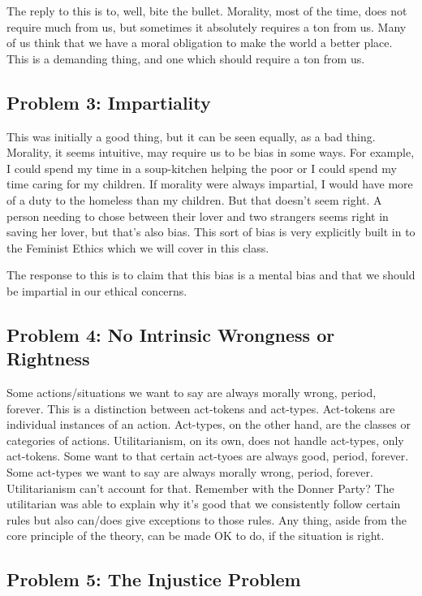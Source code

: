 The reply to this is to, well, bite the bullet. Morality, most of the time, does not require much from us, but sometimes it absolutely requires a ton from us. Many of us think that we have a moral obligation to make the world a better place. This is a demanding thing, and one which should require a ton from us.
\subsection{Problem 3: Impartiality}

This was initially a good thing, but it can be seen equally, as a bad thing. Morality, it seems intuitive, may require us to be bias in some ways. For example, I could spend my time in a soup-kitchen helping the poor or I could spend my time caring for my children. If morality were always impartial, I would have more of a duty to the homeless than my children. But that doesn’t seem right. A person needing to chose between their lover and two strangers seems right in saving her lover, but that’s also bias. This sort of bias is very explicitly built in to the Feminist Ethics which we will cover in this class.

The response to this is to claim that this bias is a mental bias and that we should be impartial in our ethical concerns. 
\subsection{Problem 4: No Intrinsic Wrongness or Rightness}

Some actions/situations we want to say are always morally wrong, period, forever. This is a distinction between act-tokens and act-types. Act-tokens are individual instances of an action. Act-types, on the other hand, are the classes or categories of actions. Utilitarianism, on its own, does not handle act-types, only act-tokens. Some want to that certain act-tyoes are always  good, period, forever. Some act-types we want to say are always morally wrong, period, forever. Utilitarianism can’t account for that. Remember with the Donner Party? The utilitarian was able to explain why it’s good that we consistently follow certain rules but also can/does give exceptions to those rules. Any thing, aside from the core principle of the theory, can be made OK to do, if the situation is right.
\subsection{Problem 5: The Injustice Problem}

